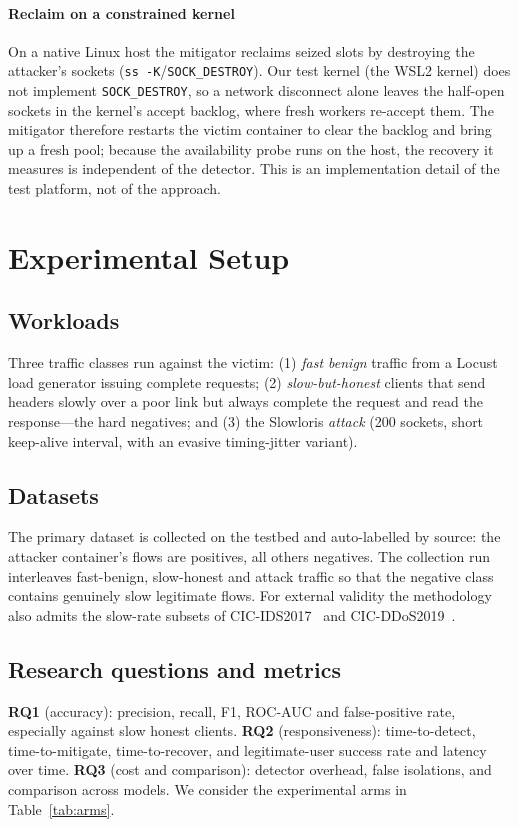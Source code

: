 \documentclass[conference]{IEEEtran}
\begin{document}
\paragraph{Reclaim on a constrained kernel} On a native Linux host the mitigator
reclaims seized slots by destroying the attacker's sockets
(\texttt{ss -K}/\texttt{SOCK\_DESTROY}). Our test kernel (the WSL2 kernel) does
not implement \texttt{SOCK\_DESTROY}, so a network disconnect alone leaves the
half-open sockets in the kernel's accept backlog, where fresh workers re-accept
them. The mitigator therefore restarts the victim container to clear the backlog
and bring up a fresh pool; because the availability probe runs on the host, the
recovery it measures is independent of the detector. This is an implementation
detail of the test platform, not of the approach.

\section{Experimental Setup}
\subsection{Workloads}
Three traffic classes run against the victim: (1) \emph{fast benign} traffic from
a Locust load generator issuing complete requests; (2) \emph{slow-but-honest}
clients that send headers slowly over a poor link but always complete the request
and read the response---the hard negatives; and (3) the Slowloris \emph{attack}
(200 sockets, short keep-alive interval, with an evasive timing-jitter variant).

\subsection{Datasets}
The primary dataset is collected on the testbed and auto-labelled by source: the
attacker container's flows are positives, all others negatives. The collection
run interleaves fast-benign, slow-honest and attack traffic so that the negative
class contains genuinely slow legitimate flows. For external validity the
methodology also admits the slow-rate subsets of
CIC-IDS2017~\cite{sharafaldin2018cicids} and
CIC-DDoS2019~\cite{sharafaldin2019ddos}.

\subsection{Research questions and metrics}
\textbf{RQ1} (accuracy): precision, recall, F1, ROC-AUC and false-positive rate,
especially against slow honest clients. \textbf{RQ2} (responsiveness):
time-to-detect, time-to-mitigate, time-to-recover, and legitimate-user success
rate and latency over time. \textbf{RQ3} (cost and comparison): detector
overhead, false isolations, and comparison across models. We consider the
experimental arms in Table~\ref{tab:arms}.
\end{document}
